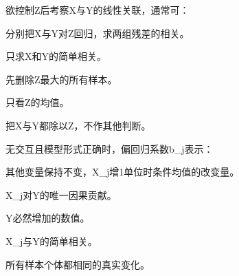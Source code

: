 \par\addvspace{6pt}\noindent\begin{minipage}{\linewidth}


欲控制Z后考察X与Y的线性关联，通常可：


\begin{choices}

\item 分别把X与Y对Z回归，求两组残差的相关。

\item 只求X和Y的简单相关。

\item 先删除Z最大的所有样本。

\item 只看Z的均值。

\item 把X与Y都除以Z，不作其他判断。

\end{choices}

\end{minipage}\par\vspace{4pt}

\par\addvspace{6pt}\noindent\begin{minipage}{\linewidth}


无交互且模型形式正确时，偏回归系数b\_j表示：


\begin{choices}

\item 其他变量保持不变，X\_j增1单位时条件均值的改变量。

\item X\_j对Y的唯一因果贡献。

\item Y必然增加的数值。

\item X\_j与Y的简单相关。

\item 所有样本个体都相同的真实变化。

\end{choices}

\end{minipage}\par\vspace{4pt}

